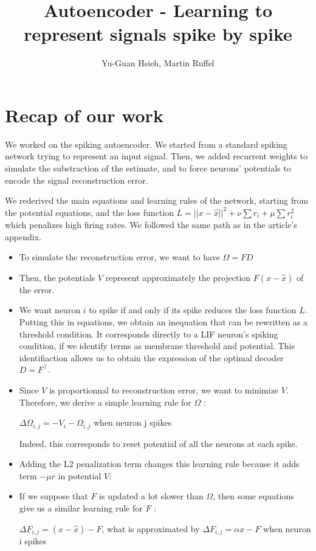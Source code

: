 \documentclass[a4paper,10pt, english]{article}
\title{Autoencoder - Learning to represent signals spike by spike}
\author{Yu-Guan Hsieh, Martin Ruffel}
\begin{document}
\maketitle

\section*{Recap of our work}

We worked on the spiking autoencoder. We started from a standard spiking network trying to represent an input signal.
Then, we added recurrent weights to simulate the substraction of the estimate, and to force neurons' potentials
to encode the signal reconstruction error. 


We rederived the main equations and learning rules of the network, starting from the potential equations, 
and the loss function $L = ||x - \hat{x}||^2 + \nu \sum{r_{i}} + \mu \sum{r_{i}^2}$ which penalizes high 
firing rates. We followed the same path as in the article's appendix.

\begin{itemize}
 \item To simulate the reconstruction error, we want to have $\Omega = FD$
 \item Then, the potentials $V$ represent approximately the projection $F(x - \hat{x})$ of the error.
 \item We want neuron $i$ to spike if and only if its spike reduces the loss function $L$. Putting this 
 in equations, we obtain an inequation that can be rewritten as a threshold condition. It corresponds directly to a LIF neuron's spiking condition, if we identify terms as membrane threshold and potential.
 This identifiaction allows us to obtain the expression of the optimal decoder $D = F^\top$.
 \item Since $V$ is proportionnal to reconstruction error, we want to minimize $V$. Therefore, we derive 
 a simple learning rule for $\Omega$ :
 \begin{center}
  {$\Delta\Omega_{i,j} = -V_{i} -\Omega_{i,j}$} when neuron j spikes
 \end{center}
Indeed, this corresponds to reset potential of all the neurons at each spike.
 \item Adding the L2 penalization term changes this learning rule because it adds term $-\mu r$ in potential $V$:
 \begin{center}
 \end{center}
 \item If we suppose that $F$ is updated a lot slower than $\Omega$, then some equations give us a similar 
 learning rule for $F$ :
 \begin{center}
  $\Delta F_{i,j} = (x - \hat{x}) - F$, what is approximated by $\Delta F_{i,j} = \alpha x - F$ when neuron i spikes
 \end{center}
\end{itemize}
\end{document}
